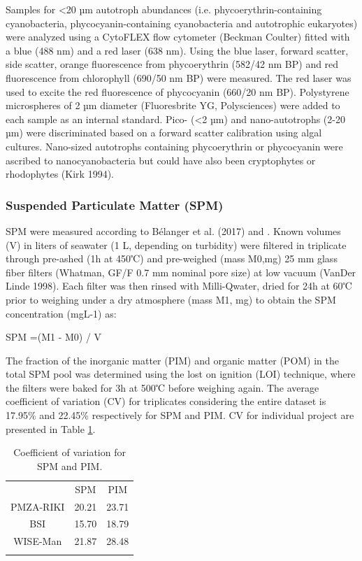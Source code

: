\documentclass[essd, manuscript]{copernicus}
\begin{document}
Samples for <20 µm autotroph abundances (i.e. phycoerythrin-containing cyanobacteria, phycocyanin-containing cyanobacteria and autotrophic eukaryotes) were analyzed using a CytoFLEX flow cytometer (Beckman Coulter) fitted with a blue (488 nm) and a red laser (638 nm). Using the blue laser, forward scatter, side scatter, orange fluorescence from phycoerythrin (582/42 nm BP) and red fluorescence from chlorophyll (690/50 nm BP) were measured. The red laser was used to excite the red fluorescence of phycocyanin (660/20 nm BP). Polystyrene microspheres of 2 µm diameter (Fluoresbrite YG, Polysciences) were added to each sample as an internal standard. Pico- (<2 µm) and nano-autotrophs (2-20 µm) were discriminated based on a forward scatter calibration using algal cultures. Nano-sized autotrophs containing phycoerythrin or phycocyanin were ascribed to nanocyanobacteria but could have also been cryptophytes or rhodophytes (Kirk 1994).

\subsubsection{Suspended Particulate Matter (SPM)}
SPM were measured according to Bélanger et al. (2017) and \citet{Mabit2022}. Known volumes (V) in liters of seawater (1 L, depending on turbidity) were filtered in triplicate through pre-ashed (1h at 450℃) and pre-weighed (mass M0,mg) 25 mm glass fiber filters (Whatman, GF/F 0.7 mm nominal pore size) at low vacuum (VanDer Linde 1998). Each filter was then rinsed with Milli-Qwater, dried for 24h at 60℃ prior to weighing under a dry atmosphere (mass M1, mg) to obtain the SPM concentration (mgL-1) as:

SPM =(M1 - M0) / V

The fraction of the inorganic matter (PIM) and organic matter (POM) in the total SPM pool was determined using the  lost on ignition (LOI) technique, where the filters were baked for 3h at 500℃ before weighing again.
The average coefficient of variation (CV) for triplicates considering the entire dataset is 17.95\% and 22.45\% respectively for SPM and PIM. CV for individual project are presented in Table  \ref{table:SPMCV}.

\begin{table}[t]
\caption{Coefficient of variation for SPM and PIM.}
\centering
\begin{tabular}{ c|cc  }
\tophline
 & SPM & PIM\\
\middlehline
PMZA-RIKI & 20.21 & 23.71 \\
BSI & 15.70 & 18.79 \\
WISE-Man & 21.87 & 28.48 \\
\bottomhline
 \end{tabular}
 \label{table:SPMCV}
\end{table}
\end{document}
